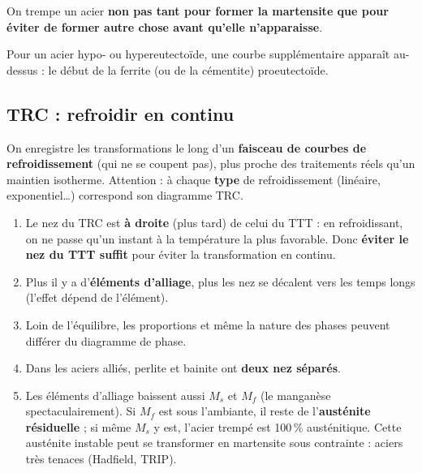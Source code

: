 \begin{keybox}[title=La phrase à retenir]
On trempe un acier \textbf{non pas tant pour former la martensite que pour éviter de former autre
chose avant qu'elle n'apparaisse}.
\end{keybox}

Pour un acier hypo- ou hypereutectoïde, une courbe supplémentaire apparaît au-dessus : le début
de la ferrite (ou de la cémentite) proeutectoïde.

\subsection*{TRC : refroidir en continu}


\begin{defnbox}[title={Diagramme TRC (\emph{CCT}, transformation en refroidissement continu)}]
On enregistre les transformations le long d'un \textbf{faisceau de courbes de refroidissement}
(qui ne se coupent pas), plus proche des traitements réels qu'un maintien isotherme. Attention :
à chaque \textbf{type} de refroidissement (linéaire, exponentiel\ldots) correspond son diagramme
TRC.
\end{defnbox}

\begin{propbox}[title={Ce qu'il faut savoir des TTT et TRC}]
\begin{enumerate}
  \item Le nez du TRC est \textbf{à droite} (plus tard) de celui du TTT : en refroidissant, on ne
        passe qu'un instant à la température la plus favorable. Donc \textbf{éviter le nez du TTT
        suffit} pour éviter la transformation en continu.
  \item Plus il y a d'\textbf{éléments d'alliage}, plus les nez se décalent vers les temps
        longs (l'effet dépend de l'élément).
  \item Loin de l'équilibre, les proportions et même la nature des phases peuvent différer du
        diagramme de phase.
  \item Dans les aciers alliés, perlite et bainite ont \textbf{deux nez séparés}.
  \item Les éléments d'alliage baissent aussi $M_s$ et $M_f$ (le manganèse spectaculairement). Si
        $M_f$ est sous l'ambiante, il reste de l'\textbf{austénite résiduelle} ; si même $M_s$ y
        est, l'acier trempé est 100\,\% austénitique. Cette austénite instable peut se transformer
        en martensite sous contrainte : aciers très tenaces (Hadfield, TRIP).
\end{enumerate}
\end{propbox}

